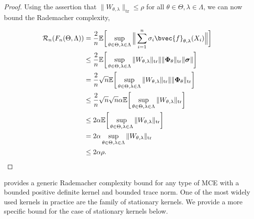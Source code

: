 \documentclass{llncs}
\numberwithin{equation}{section}
\numberwithin{table}{section}
\numberwithin{algorithm}{section}
\begin{document}
\begin{theorem}
\begin{proof}
			Using the assertion that $\| W_{\theta, \lambda} \|_{\mathrm{tr}} \leq \rho$ for all $\theta \in \Theta, \lambda \in \Lambda$, we can now bound the Rademacher complexity,
			
			\begin{equation}
			\begin{aligned}
			\mathcal{R}_{n}(F_{n}(\Theta, \Lambda)) &= \frac{2}{n} \mathbb{E}\bigg[\sup_{\theta \in \Theta, \lambda \in \Lambda} \Big\| \sum_{i = 1}^{n} \sigma_{i}\bvec{f}_{\theta, \lambda}(X_{i}) \Big\|\bigg] \\
			&\leq \frac{2}{n} \mathbb{E}\bigg[\sup_{\theta \in \Theta, \lambda \in \Lambda} \|  W_{\theta, \lambda} \|_{\mathrm{tr}} \| \| \bm{\Phi}_{\theta} \|_{\mathrm{tr}} \| \bm{\sigma} \| \bigg] \\
			&= \frac{2}{n} \sqrt{n} \mathbb{E}\bigg[\sup_{\theta \in \Theta, \lambda \in \Lambda} \|  W_{\theta, \lambda} \|_{\mathrm{tr}} \| \| \bm{\Phi}_{\theta} \|_{\mathrm{tr}} \bigg] \\
			&\leq \frac{2}{n} \sqrt{n} \sqrt{n} \alpha \mathbb{E}\bigg[\sup_{\theta \in \Theta, \lambda \in \Lambda} \|  W_{\theta, \lambda} \|_{\mathrm{tr}} \bigg] \\
			&\leq 2 \alpha \mathbb{E}\bigg[\sup_{\theta \in \Theta, \lambda \in \Lambda} \|  W_{\theta, \lambda} \|_{\mathrm{tr}} \bigg] \\
			&= 2 \alpha \sup_{\theta \in \Theta, \lambda \in \Lambda} \|  W_{\theta, \lambda} \|_{\mathrm{tr}} \\
			&\leq 2 \alpha \rho.
			\end{aligned}
			\end{equation}
		\end{proof}
	\end{theorem}
	
	 provides a generic Rademacher complexity bound for any type of \gls{MCE} with a bounded positive definite kernel and bounded trace norm. One of the most widely used kernels in practice are the family of stationary kernels. We provide a more specific bound for the case of stationary kernels below.
	
\end{document}

